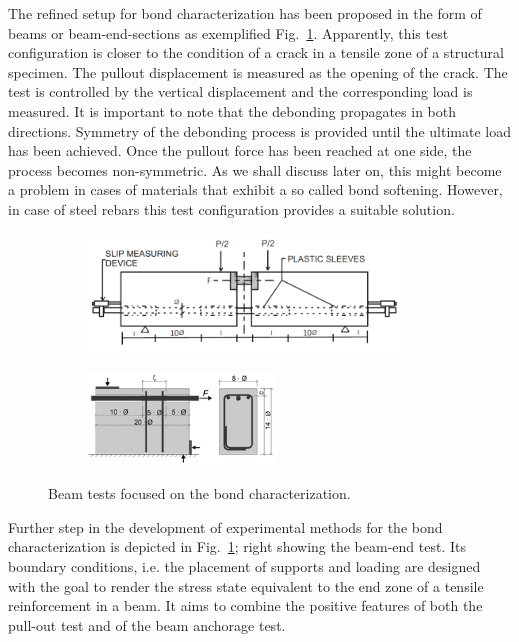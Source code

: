 \documentclass[main.tex]{subfiles}
\begin{document}
The refined setup for bond characterization has been proposed 
in the form of beams or beam-end-sections as exemplified Fig.~\ref{fig:pull-beam_end_test}.
Apparently, this test configuration is closer to the condition of a crack in a tensile zone of 
a structural specimen. The pullout displacement is measured as the opening of the crack. 
The test is controlled by 
the vertical displacement and the corresponding load is measured. 
It is important to note that the debonding propagates in both directions. 
Symmetry of the debonding process is provided until the ultimate load has been achieved. Once 
the pullout force has been reached at one side, the process becomes non-symmetric.
As we shall discuss later on, this might become a problem in cases of 
materials that exhibit a so called bond softening. However, in case of steel rebars
this test configuration provides a suitable solution.
\begin{figure}[tb]
	\centering
	\begin{subfigure}{0.48\textwidth}
	\centering
  \includegraphics[width=8.3cm]{fig/Lecture02/_300___beam-pullout-test.png}
	\end{subfigure}
	\begin{subfigure}{0.48\textwidth}
	\centering
  \includegraphics[width=5cm]{fig/Lecture02/beam_end_test.png}
	\end{subfigure}
	\caption{Beam tests focused on the bond characterization.}
	\label{fig:pull-beam_end_test}
\end{figure}

Further step in the development of experimental methods for the bond characterization is depicted in Fig.~\ref{fig:pull-beam_end_test}; right showing the beam-end test. Its boundary conditions, i.e. the placement of supports and loading are designed with the goal to render the stress state equivalent to the end zone of a tensile reinforcement in a beam. It aims to combine the positive features of both the pull-out test and of the beam anchorage test.  
\end{document}
